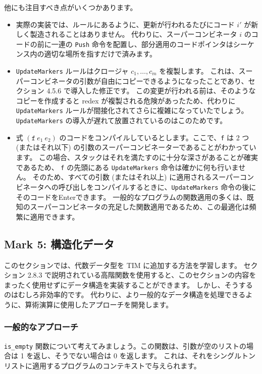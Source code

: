 \documentclass{jarticle}
\begin{document}
他にも注目すべき点がいくつかあります。

\begin{itemize}
	\item 実際の実装では、ルールにあるように、更新が行われるたびにコード $i'$ が新しく製造されることはありません。
	      代わりに、スーパーコンビネータ $i$ のコードの前に一連の \texttt{Push} 命令を配置し、部分適用のコードポインタはシーケンス内の適切な場所を指すだけで済みます。
	\item \texttt{UpdateMarkers} ルールはクロージャ $c_1, \ldots, c_m$ を複製します。
	      これは、スーパーコンビネータの引数が自由にコピーできるようになったことであり、セクション 4.5.6 で導入した修正です。
	      この変更が行われる前は、そのようなコピーを作成すると redex が複製される危険があったため、代わりに \texttt{UpdateMarkers} ルールが間接化されてさらに複雑になっていたでしょう。
	      \texttt{UpdateMarkers} の導入が遅れて放置されているのはこのためです。
	\item 式 $(\texttt{f} ~ e_1 ~ e_2)$ のコードをコンパイルしているとします。ここで、\texttt{f} は 2 つ (またはそれ以下) の引数のスーパーコンビネーターであることがわかっています。
	      この場合、スタックはそれを満たすのに十分な深さがあることが確実であるため、 \texttt{f} の先頭にある \texttt{UpdateMarkers} 命令は確かに何も行いません。
	      そのため、すべての引数 (またはそれ以上) に適用されるスーパーコンビネータへの呼び出しをコンパイルするときに、\texttt{UpdateMarkers} 命令の後にそのコードをEnterできます。
	      一般的なプログラムの関数適用の多くは、既知のスーパーコンビネータの充足した関数適用であるため、この最適化は頻繁に適用できます。
\end{itemize}
\newpage

\subsection{Mark 5: 構造化データ}

このセクションでは、代数データ型を TIM に追加する方法を学習します。
セクション 2.8.3 で説明されている高階関数を使用すると、このセクションの内容をまったく使用せずにデータ構造を実装することができます。
しかし、そうするのはむしろ非効率的です。
代わりに、より一般的なデータ構造を処理できるように、算術演算に使用したアプローチを開発します。

\subsubsection{一般的なアプローチ}

\texttt{is\_empty} 関数について考えてみましょう。この関数は、引数が空のリストの場合は 1 を返し、そうでない場合は 0 を返します。
これは、それをシングルトン リストに適用するプログラムのコンテキストで与えられます。
\end{document}

